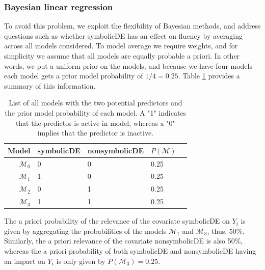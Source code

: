 \documentclass[english,,doc,floatsintext]{apa6}
\begin{document}
\hypertarget{bayesian-linear-regression}{%
\subsubsection{Bayesian linear regression}\label{bayesian-linear-regression}}

To avoid this problem, we exploit the flexibility of Bayesian methods, and address questions such as whether symbolicDE has an effect on fluency by averaging across all models considered. To model average we require weights, and for simplicity we assume that all models are equally probable a priori. In other words, we put a uniform prior on the models, and because we have four models each model gets a prior model probability of \(1/4=0.25\). Table \ref{tabLinreg} provides a summary of this information.

\begin{table}
\label{tabLinreg} 
\caption{List of all models with the two potential predictors and the prior model probability of each model. A "1" indicates that the predictor is active in model, whereas a "0" implies that the predictor is inactive.}
\begin{center}
\begin{tabular}{rllll}
\hline
Model & symbolicDE & nonsymbolicDE & \( P(\mathcal{M}) \) \\
\hline
\( \mathcal{M}_{0} \) & 0 & 0 & 0.25 \\
\( \mathcal{M}_{1} \) & 1 & 0 & 0.25 \\
\( \mathcal{M}_{2} \) & 0 & 1 & 0.25 \\
\( \mathcal{M}_{3} \) & 1 & 1 & 0.25 \\
\hline
\end{tabular}
\end{center}
\end{table}

The a priori probability of the relevance of the covariate symbolicDE on \(Y_{i}\) is given by aggregating the probabilities of the models \(\mathcal{M}_{1}\) and \(\mathcal{M}_{3}\), thus, 50\%. Similarly, the a priori relevance of the covariate nonsymbolicDE is also 50\%, whereas the a priori probability of both symbolicDE and nonsymbolicDE having an impact on \(Y_{i}\) is only given by \(P(\mathcal{M}_{3}) = 0.25\).
\end{document}
